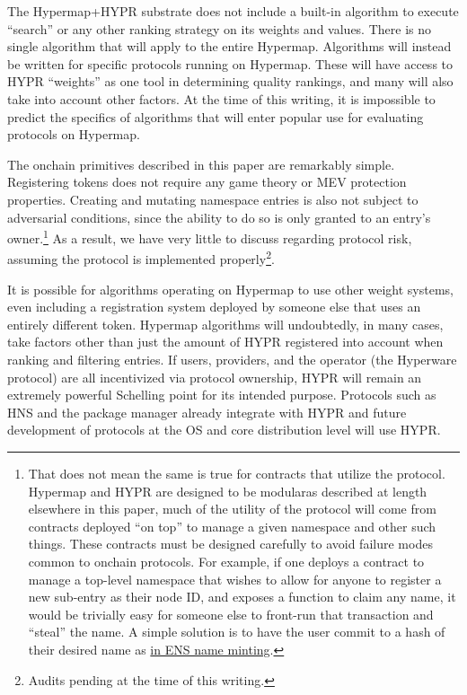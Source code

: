 \documentclass[runningheads]{llncs}
\begin{document}
The Hypermap+HYPR substrate does not include a built-in algorithm to execute ``search'' or any other ranking strategy on its weights and values.
There is no single algorithm that will apply to the entire Hypermap.
Algorithms will instead be written for specific protocols running on Hypermap.
These will have access to HYPR ``weights'' as one tool in determining quality rankings, and many will also take into account other factors.
At the time of this writing, it is impossible to predict the specifics of algorithms that will enter popular use for evaluating protocols on Hypermap.

The onchain primitives described in this paper are remarkably simple.
Registering tokens does not require any game theory or MEV protection properties.
Creating and mutating namespace entries is also not subject to adversarial conditions, since the ability to do so is only granted to an entry's owner.\footnote{That does not mean the same is true for contracts that utilize the protocol.
Hypermap and HYPR are designed to be modular\textemdash as described at length elsewhere in this paper, much of the utility of the protocol will come from contracts deployed ``on top'' to manage a given namespace and other such things.
These contracts must be designed carefully to avoid failure modes common to onchain protocols.
For example, if one deploys a contract to manage a top-level namespace that wishes to allow for anyone to register a new sub-entry as their node ID, and exposes a function to claim any name, it would be trivially easy for someone else to front-run that transaction and ``steal'' the name.
A simple solution is to have the user commit to a hash of their desired name as \href{https://docs.ens.domains/registry/eth\#commit-reveal}{in ENS name minting}.}
As a result, we have very little to discuss regarding protocol risk, assuming the protocol is implemented properly\footnote{Audits pending at the time of this writing.}.

It is possible for algorithms operating on Hypermap to use other weight systems, even including a registration system deployed by someone else that uses an entirely different token.
Hypermap algorithms will undoubtedly, in many cases, take factors other than just the amount of HYPR registered into account when ranking and filtering entries.
If users, providers, and the operator (the Hyperware protocol) are all incentivized via protocol ownership, HYPR will remain an extremely powerful Schelling point for its intended purpose.
Protocols such as HNS and the package manager already integrate with HYPR and future development of protocols at the OS and core distribution level will use HYPR.
\end{document}
